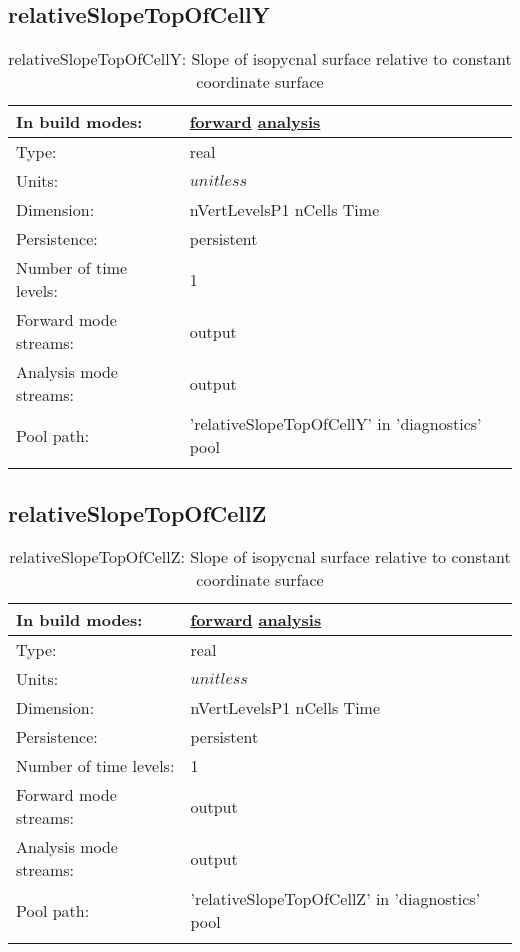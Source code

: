 \subsection[relativeSlopeTopOfCellY]{relativeSlopeTopOfCellY}
\label{subsec:var_sec_diagnostics_relativeSlopeTopOfCellY}
\begin{center}
\begin{longtable}{| p{2.0in} | p{4.0in} |}
        \hline 
        In build modes: & \hyperref[subsec:forward_var_tab_diagnostics]{forward} \hyperref[subsec:analysis_var_tab_diagnostics]{analysis} \\
        \hline 
        Type: & real \\
        \hline 
        Units: & $unitless$ \\
        \hline 
        Dimension: & nVertLevelsP1 nCells Time \\
        \hline 
        Persistence: & persistent \\
        \hline 
        Number of time levels: & 1 \\
        \hline 
		 Forward mode streams: &  output \\
        \hline 
		 Analysis mode streams: &  output \\
        \hline 
            Pool path: & 'relativeSlopeTopOfCellY' in 'diagnostics' pool
 \\
		 \hline 
    \caption{relativeSlopeTopOfCellY: Slope of isopycnal surface relative to constant coordinate surface}
\end{longtable}
\end{center}
\subsection[relativeSlopeTopOfCellZ]{relativeSlopeTopOfCellZ}
\label{subsec:var_sec_diagnostics_relativeSlopeTopOfCellZ}
\begin{center}
\begin{longtable}{| p{2.0in} | p{4.0in} |}
        \hline 
        In build modes: & \hyperref[subsec:forward_var_tab_diagnostics]{forward} \hyperref[subsec:analysis_var_tab_diagnostics]{analysis} \\
        \hline 
        Type: & real \\
        \hline 
        Units: & $unitless$ \\
        \hline 
        Dimension: & nVertLevelsP1 nCells Time \\
        \hline 
        Persistence: & persistent \\
        \hline 
        Number of time levels: & 1 \\
        \hline 
		 Forward mode streams: &  output \\
        \hline 
		 Analysis mode streams: &  output \\
        \hline 
            Pool path: & 'relativeSlopeTopOfCellZ' in 'diagnostics' pool
 \\
		 \hline 
    \caption{relativeSlopeTopOfCellZ: Slope of isopycnal surface relative to constant coordinate surface}
\end{longtable}
\end{center}
